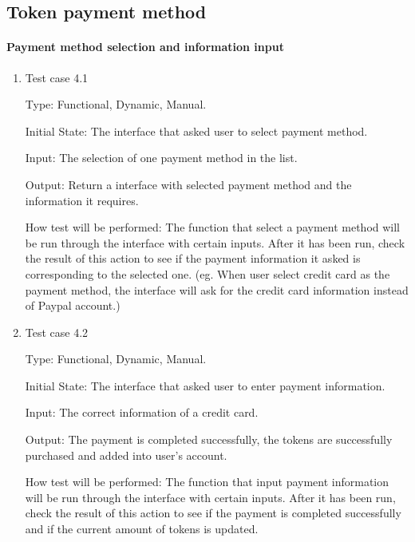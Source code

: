 \documentclass[12pt, titlepage]{article}
\begin{document}
\subsection{Token payment method}
		
\paragraph{Payment method selection and information input}

\begin{enumerate}

\item{Test case 4.1\\}

Type: Functional, Dynamic, Manual.
					
Initial State: The interface that asked user to select payment method.
					
Input: The selection of one payment method in the list.
					
Output: Return a interface with selected payment method and the information it requires.
					
How test will be performed: The function that select a payment method will be run through the interface with certain inputs. After it has been run, check the result of this action to see if the payment information it asked is corresponding to the selected one. (eg. When user select credit card as the payment method, the interface will ask for the credit card information instead of Paypal account.)
					
\item{Test case 4.2\\}

Type: Functional, Dynamic, Manual.
					
Initial State: The interface that asked user to enter payment information.
					
Input: The correct information of a credit card.
					
Output: The payment is completed successfully, the tokens are successfully purchased and added into user's account.
					
How test will be performed: The function that input payment information will be run through the interface with certain inputs. After it has been run, check the result of this action to see if the payment is completed successfully and if the current amount of tokens is updated.

\end{enumerate}
\end{document}
